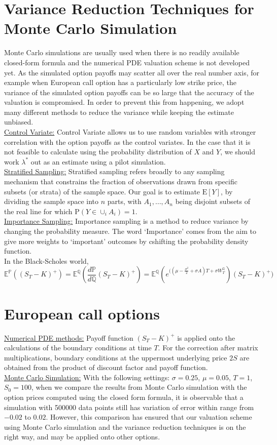 \section*{Variance Reduction Techniques for Monte Carlo Simulation}
Monte Carlo simulations are usually used when there is no readily available closed-form formula and the numerical PDE valuation scheme is not developed yet. As the simulated option payoffs may scatter all over the real number axis, for example when European call option has a particularly low strike price, the variance of the simulated option payoffs can be so large that the accuracy of the valuation is compromised. In order to prevent this from happening, we adopt many different methods to reduce the variance while keeping the estimate unbiased. \cite{VarianceReduction}\\
\underline{Control Variate:}
Control Variate allows us to use random variables with stronger correlation with the option payoffs as the control variates. In the case that it is not feasible to calculate using the probability distribution of $X$ and $Y$, we should work $\lambda^{*}$ out as an estimate using a pilot simulation.\\
\underline{Stratified Sampling:}
Stratified sampling refers broadly to any sampling mechanism that constrains the fraction of observations drawn from specific subsets (or strata) of the sample space. Our goal is to estimate $\mathrm{E}[Y]$, by dividing the sample space into $n$ parts, with $A_{1}, \dots ,A_{n}$ being disjoint subsets of the real line for which $\mathrm{P}(Y \in \cup_{i}A_{i}) = 1$. \\
\underline{Importance Sampling:}
Importance sampling is a method to reduce variance by changing the probability measure. The word `Importance' comes from the aim to give more weights to `important' outcomes by cshifting the probability density function.\\
In the Black-Scholes world,
$$\mathbb{E}^{\mathbb{P}}((S_{T} - K)^{+})= \mathbb{E}^{\mathbb{Q}}(\frac{d\mathbb{P}}{d\mathbb{Q}}(S_{T} - K)^{+}) = \mathbb{E}^{\mathbb{Q}}(e^{((\mu - \frac{\sigma^{2}}{2}+\sigma A)T + \sigma W_{T}^{\mathbb{Q}}})(S_{T} - K)^{+})$$
\section*{European call options}
\underline{Numerical PDE methods:}
Payoff function $(S_{T} - K)^{+}$ is applied onto the calculations of the boundary conditions at time $T$. For the correction after matrix multiplications, boundary conditions at the uppermost underlying price $2S$ are obtained from the product of discount factor and payoff function.\\[1mm]
\underline{Monte Carlo Simulation:}
With the following settings: $\sigma = 0.25$, $\mu = 0.05$, $T = 1$, $S_{0} = 100$, 
when we compare the results from Monte Carlo simulation with the option prices computed using the closed form formula, it is observable that a simulation with 500000 data points still has variation of error within range from $-0.02$ to $0.02$. However, this comparison has ensured that our valuation scheme using Monte Carlo simulation and the variance reduction techniques is on the right way, and may be applied onto other options.

